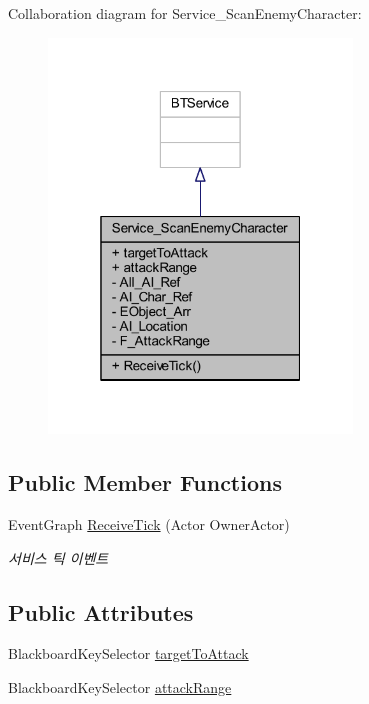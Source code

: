 Collaboration diagram for Service\+\_\+\+Scan\+Enemy\+Character\+:\nopagebreak
\begin{figure}[H]
\begin{center}
\leavevmode
\includegraphics[width=229pt]{class_service___scan_enemy_character__coll__graph}
\end{center}
\end{figure}
\subsection*{Public Member Functions}
\begin{DoxyCompactItemize}
\item 
Event\+Graph \hyperlink{class_service___scan_enemy_character_a66151b657f1393da679331e72c10336f}{Receive\+Tick} (Actor Owner\+Actor)
\begin{DoxyCompactList}\small\item\em 서비스 틱 이벤트 \end{DoxyCompactList}\end{DoxyCompactItemize}
\subsection*{Public Attributes}
\begin{DoxyCompactItemize}
\item 
Blackboard\+Key\+Selector \hyperlink{class_service___scan_enemy_character_a5bfdf42c8b2b4cf0626be2e66d0872c9}{target\+To\+Attack}
\item 
Blackboard\+Key\+Selector \hyperlink{class_service___scan_enemy_character_a979c3edbb893577752b48933d3a92271}{attack\+Range}
\end{DoxyCompactItemize}

